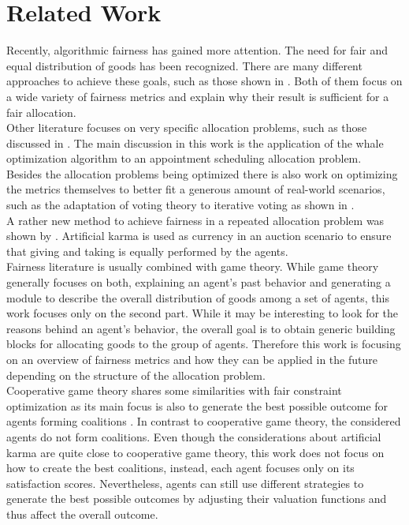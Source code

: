 \documentclass[german, a4paper, 11pt, oneside]{scrbook}
\begin{document}
\chapter{Related Work}
Recently, algorithmic fairness has gained more attention. The need for fair and equal distribution of goods has been recognized. There are many different approaches to achieve these goals, such as those shown in \cite{.2022,FelixBrandtVincentConitzerUlleEndrissJeromeLangandArielD.Procaccia.}. Both of them focus on a wide variety of fairness metrics and explain why their result is sufficient for a fair allocation. \\Other literature focuses on very specific allocation problems, such as those discussed in \cite{Ala.2021}. The main discussion in this work is the application of the whale optimization algorithm to an appointment scheduling allocation problem. \\  Besides the allocation problems being optimized there is also work on optimizing the metrics themselves to better fit a generous amount of real-world scenarios, such as the adaptation of voting theory to iterative voting as shown in \cite{Bhavnani.2022b}. 
\\ A rather new method to achieve fairness in a repeated allocation problem was shown by \cite{Elokda.2023}. Artificial karma is used as currency in an auction scenario to ensure that giving and taking is equally performed by the agents.
 \\Fairness literature is usually combined with game theory.
While game theory generally focuses on both, explaining an agent's past behavior and generating a module to describe the overall distribution of goods among a set of agents, this work focuses only on the second part. While it may be interesting to look for the reasons behind an agent's behavior, the overall goal is to obtain generic building blocks for allocating goods to the group of agents. Therefore this work is focusing on an overview of fairness metrics and how they can be applied in the future depending on the structure of the allocation problem.
\\Cooperative game theory shares some similarities with fair constraint optimization as its main focus is also to generate the best possible outcome for agents forming coalitions \cite{.2022}. In contrast to cooperative game theory, the considered agents do not form coalitions. Even though the considerations about artificial karma are quite close to cooperative game theory, this work does not focus on how to create the best coalitions, instead, each agent focuses only on its satisfaction scores. Nevertheless, agents can still use different strategies to generate the best possible outcomes by adjusting their valuation functions and thus affect the overall outcome. 
\end{document}
